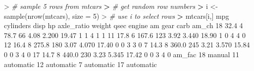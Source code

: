 \documentclass[
]{book}
\newenvironment{Shaded}{\begin{snugshade}}{\end{snugshade}}
\newcommand{\AttributeTok}[1]{\textcolor[rgb]{0.77,0.63,0.00}{#1}}
\newcommand{\CommentTok}[1]{\textcolor[rgb]{0.56,0.35,0.01}{\textit{#1}}}
\newcommand{\DecValTok}[1]{\textcolor[rgb]{0.00,0.00,0.81}{#1}}
\newcommand{\ErrorTok}[1]{\textcolor[rgb]{0.64,0.00,0.00}{\textbf{#1}}}
\newcommand{\FloatTok}[1]{\textcolor[rgb]{0.00,0.00,0.81}{#1}}
\newcommand{\FunctionTok}[1]{\textcolor[rgb]{0.00,0.00,0.00}{#1}}
\newcommand{\NormalTok}[1]{#1}
\newcommand{\OtherTok}[1]{\textcolor[rgb]{0.56,0.35,0.01}{#1}}
\newcommand{\SpecialCharTok}[1]{\textcolor[rgb]{0.00,0.00,0.00}{#1}}
\begin{document}
\begin{Shaded}
\begin{Highlighting}[]
\SpecialCharTok{\textgreater{}} \CommentTok{\# sample 5 rows from mtcars}
\ErrorTok{\textgreater{}} \CommentTok{\# get random row numbers}
\ErrorTok{\textgreater{}}\NormalTok{ i }\OtherTok{\textless{}{-}} \FunctionTok{sample}\NormalTok{(}\FunctionTok{nrow}\NormalTok{(mtcars), }\AttributeTok{size =} \DecValTok{5}\NormalTok{)}
\SpecialCharTok{\textgreater{}} \CommentTok{\# use i to select rows}
\ErrorTok{\textgreater{}}\NormalTok{ mtcars[i,]}
\NormalTok{    mpg cylinders  disp  hp axle\_ratio weight  qsec engine am gear carb am\_ch}
\DecValTok{18} \FloatTok{32.4}         \DecValTok{4}  \FloatTok{78.7}  \DecValTok{66}       \FloatTok{4.08}  \FloatTok{2.200} \FloatTok{19.47}      \DecValTok{1}  \DecValTok{1}    \DecValTok{4}    \DecValTok{1}     \DecValTok{1}
\DecValTok{11} \FloatTok{17.8}         \DecValTok{6} \FloatTok{167.6} \DecValTok{123}       \FloatTok{3.92}  \FloatTok{3.440} \FloatTok{18.90}      \DecValTok{1}  \DecValTok{0}    \DecValTok{4}    \DecValTok{4}     \DecValTok{0}
\DecValTok{12} \FloatTok{16.4}         \DecValTok{8} \FloatTok{275.8} \DecValTok{180}       \FloatTok{3.07}  \FloatTok{4.070} \FloatTok{17.40}      \DecValTok{0}  \DecValTok{0}    \DecValTok{3}    \DecValTok{3}     \DecValTok{0}
\DecValTok{7}  \FloatTok{14.3}         \DecValTok{8} \FloatTok{360.0} \DecValTok{245}       \FloatTok{3.21}  \FloatTok{3.570} \FloatTok{15.84}      \DecValTok{0}  \DecValTok{0}    \DecValTok{3}    \DecValTok{4}     \DecValTok{0}
\DecValTok{17} \FloatTok{14.7}         \DecValTok{8} \FloatTok{440.0} \DecValTok{230}       \FloatTok{3.23}  \FloatTok{5.345} \FloatTok{17.42}      \DecValTok{0}  \DecValTok{0}    \DecValTok{3}    \DecValTok{4}     \DecValTok{0}
\NormalTok{      am\_fac}
\DecValTok{18}\NormalTok{    manual}
\DecValTok{11}\NormalTok{ automatic}
\DecValTok{12}\NormalTok{ automatic}
\DecValTok{7}\NormalTok{  automatic}
\DecValTok{17}\NormalTok{ automatic}
\end{Highlighting}
\end{Shaded}
\end{document}
